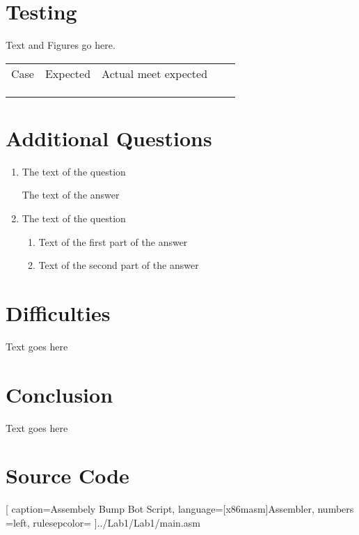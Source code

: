 \documentclass[12pt,letterpaper]{article}
\begin{document}
\section{Testing}
Text and Figures go here.
\begin{table}[h]
	\begin{tabular}{|l|l|l|ll}
		\cline{1-3}
		Case & Expected & Actual meet expected &  &  \\ \cline{1-3}
		&          &                      &  &  \\ \cline{1-3}
		&          &                      &  &  \\ \cline{1-3}
		&          &                      &  &  \\ \cline{1-3}
	\end{tabular}
\end{table}

\section{Additional Questions}
\begin{enumerate}
    \item
    The text of the question

    The text of the answer

    \item
    The text of the question
    \begin{enumerate}
        \item
        Text of the first part of the answer

        \item
        Text of the second part of the answer
    \end{enumerate}

\end{enumerate}

\section{Difficulties}
Text goes here

\section{Conclusion}
Text goes here

\section{Source Code}%



[
caption=Assembely Bump Bot Script,
language={[x86masm]Assembler},
numbers =left,
rulesepcolor=\color{blue}
]{../Lab1/Lab1/main.asm}

\end{document}
